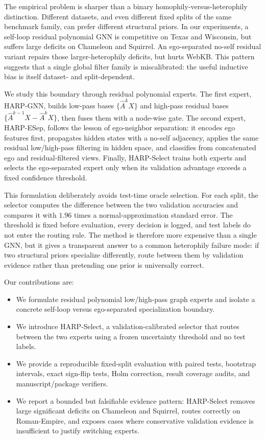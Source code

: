\documentclass[letterpaper]{article} %
\newcommand{\base}{HARP-GNN}
\newcommand{\esep}{HARP-ESep}
\newcommand{\method}{HARP-Select}
\begin{document}
The empirical problem is sharper than a binary homophily-versus-heterophily distinction.
Different datasets, and even different fixed splits of the same benchmark family, can prefer different structural priors.
In our experiments, a self-loop residual polynomial GNN is competitive on Texas and Wisconsin, but suffers large deficits on Chameleon and Squirrel.
An ego-separated no-self residual variant repairs those larger-heterophily deficits, but hurts WebKB.
This pattern suggests that a single global filter family is miscalibrated: the useful inductive bias is itself dataset- and split-dependent.

We study this boundary through residual polynomial experts.
The first expert, \base, builds low-pass bases $\{\hat{A}^kX\}$ and high-pass residual bases $\{\hat{A}^{k-1}X-\hat{A}^{k}X\}$, then fuses them with a node-wise gate.
The second expert, \esep, follows the lesson of ego-neighbor separation: it encodes ego features first, propagates hidden states with a no-self adjacency, applies the same residual low/high-pass filtering in hidden space, and classifies from concatenated ego and residual-filtered views.
Finally, \method{} trains both experts and selects the ego-separated expert only when its validation advantage exceeds a fixed confidence threshold.

This formulation deliberately avoids test-time oracle selection.
For each split, the selector computes the difference between the two validation accuracies and compares it with $1.96$ times a normal-approximation standard error.
The threshold is fixed before evaluation, every decision is logged, and test labels do not enter the routing rule.
The method is therefore more expensive than a single GNN, but it gives a transparent answer to a common heterophily failure mode: if two structural priors specialize differently, route between them by validation evidence rather than pretending one prior is universally correct.

Our contributions are:
\begin{itemize}
  \item We formulate residual polynomial low/high-pass graph experts and isolate a concrete self-loop versus ego-separated specialization boundary.
  \item We introduce \method, a validation-calibrated selector that routes between the two experts using a frozen uncertainty threshold and no test labels.
  \item We provide a reproducible fixed-split evaluation with paired tests, bootstrap intervals, exact sign-flip tests, Holm correction, result coverage audits, and manuscript/package verifiers.
  \item We report a bounded but falsifiable evidence pattern: \method{} removes large significant deficits on Chameleon and Squirrel, routes correctly on Roman-Empire, and exposes cases where conservative validation evidence is insufficient to justify switching experts.
\end{itemize}
\end{document}
